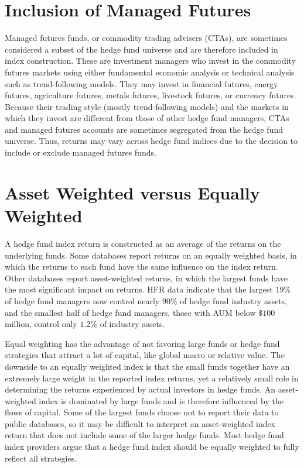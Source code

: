 \documentclass[11pt]{article}
\begin{document}
\section*{Inclusion of Managed Futures}
Managed futures funds, or commodity trading advisers (CTAs), are sometimes considered a subset of the hedge fund universe and are therefore included in index construction. These are investment managers who invest in the commodity futures markets using either fundamental economic analysis or technical analysis such as trend-following models. They may invest in financial futures, energy futures, agriculture futures, metals futures, livestock futures, or currency futures. Because their trading style (mostly trend-following models) and the markets in which they invest are different from those of other hedge fund managers, CTAs and managed futures accounts are sometimes segregated from the hedge fund universe. Thus, returns may vary across hedge fund indices due to the decision to include or exclude managed futures funds.

\section*{Asset Weighted versus Equally Weighted}
A hedge fund index return is constructed as an average of the returns on the underlying funds. Some databases report returns on an equally weighted basis, in which the returns to each fund have the same influence on the index return. Other databases report asset-weighted returns, in which the largest funds have the most significant impact on returns. HFR data indicate that the largest $19 \%$ of hedge fund managers now control nearly $90 \%$ of hedge fund industry assets, and the smallest half of hedge fund managers, those with AUM below $\$ 100$ million, control only $1.2 \%$ of industry assets.

Equal weighting has the advantage of not favoring large funds or hedge fund strategies that attract a lot of capital, like global macro or relative value. The downside to an equally weighted index is that the small funds together have an extremely large weight in the reported index returns, yet a relatively small role in determining the returns experienced by actual investors in hedge funds. An asset-weighted index is dominated by large funds and is therefore influenced by the flows of capital. Some of the largest funds choose not to report their data to public databases, so it may be difficult to interpret an asset-weighted index return that does not include some of the larger hedge funds. Most hedge fund index providers argue that a hedge fund index should be equally weighted to fully reflect all strategies.
\end{document}
